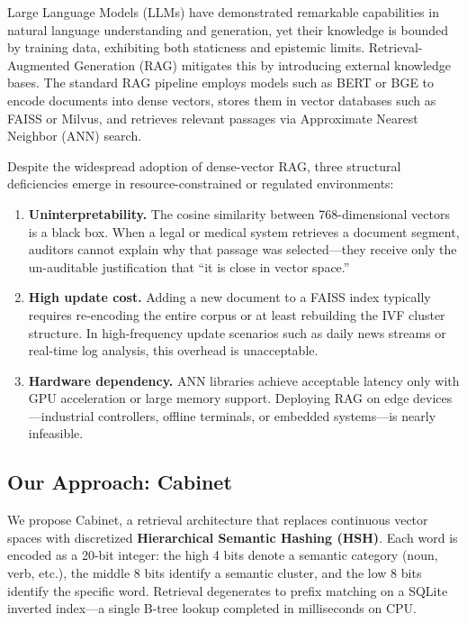 \documentclass[11pt,a4paper]{article}
\theoremstyle{definition}
\begin{document}
Large Language Models (LLMs) have demonstrated remarkable capabilities in natural language understanding and generation, yet their knowledge is bounded by training data, exhibiting both staticness and epistemic limits. Retrieval-Augmented Generation (RAG) mitigates this by introducing external knowledge bases. The standard RAG pipeline employs models such as BERT or BGE to encode documents into dense vectors, stores them in vector databases such as FAISS or Milvus, and retrieves relevant passages via Approximate Nearest Neighbor (ANN) search.

Despite the widespread adoption of dense-vector RAG, three structural deficiencies emerge in resource-constrained or regulated environments:

\begin{enumerate}[leftmargin=*]
    \item \textbf{Uninterpretability.} The cosine similarity between 768-dimensional vectors is a black box. When a legal or medical system retrieves a document segment, auditors cannot explain why that passage was selected---they receive only the un-auditable justification that ``it is close in vector space.''
    \item \textbf{High update cost.} Adding a new document to a FAISS index typically requires re-encoding the entire corpus or at least rebuilding the IVF cluster structure. In high-frequency update scenarios such as daily news streams or real-time log analysis, this overhead is unacceptable.
    \item \textbf{Hardware dependency.} ANN libraries achieve acceptable latency only with GPU acceleration or large memory support. Deploying RAG on edge devices---industrial controllers, offline terminals, or embedded systems---is nearly infeasible.
\end{enumerate}

\subsection{Our Approach: Cabinet}

We propose Cabinet, a retrieval architecture that replaces continuous vector spaces with discretized \textbf{Hierarchical Semantic Hashing (HSH)}. Each word is encoded as a 20-bit integer: the high 4 bits denote a semantic category (noun, verb, etc.), the middle 8 bits identify a semantic cluster, and the low 8 bits identify the specific word. Retrieval degenerates to prefix matching on a SQLite inverted index---a single B-tree lookup completed in milliseconds on CPU.
\end{document}
